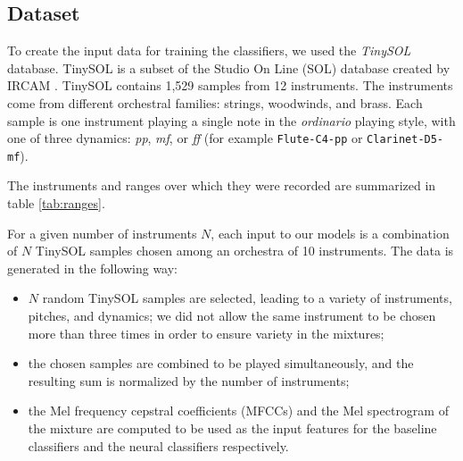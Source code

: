 \documentclass[runningheads,a4paper]{llncs}
\begin{document}


\subsection{Dataset}
\label{sec:dataset}

To create the input data for training the classifiers, we used the \emph{TinySOL} database. TinySOL is a subset of the Studio On Line (SOL) database created by IRCAM \cite{Cella2020b}. TinySOL contains 1,529 samples from 12 instruments. The instruments come from different orchestral families: strings, woodwinds, and brass. Each sample is one instrument playing a single note in the \emph{ordinario} playing style, with one of three dynamics: \textit{pp}, \textit{mf}, or \textit{ff} (for example \texttt{Flute-C4-pp} or \texttt{Clarinet-D5-mf}). 

The instruments and ranges over which they were recorded are summarized in table \ref{tab:ranges}.

For a given number of instruments $N$, each input to our models is a combination of $N$ TinySOL samples chosen among an orchestra of 10 instruments. The data is generated in the following way:

\begin{itemize}
\item $N$ random TinySOL samples are selected, leading to a variety of instruments, pitches, and dynamics; we did not allow the same instrument to be chosen more than three times in order to ensure variety in the mixtures;
\item the chosen samples are combined to be played simultaneously, and the resulting sum is normalized by the number of instruments;
\item the Mel frequency cepstral coefficients (MFCCs) and the Mel spectrogram of the mixture are computed to be used as the input features for the baseline classifiers and the neural classifiers respectively.
\end{itemize}
\end{document}
